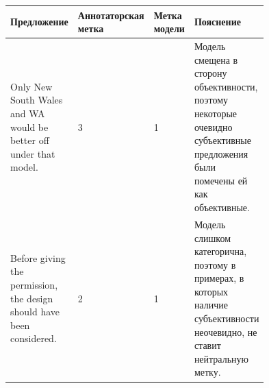 \documentclass[conference]{IEEEtran}
\begin{document}
\begin{table}[h!]
    \begin{center}
        \begin{tabular}{|l|l|l|l|}
            \hline
            Предложение & \thead{Аннотаторская \\ метка} & \thead{Метка \\ модели} & Пояснение \\ \hline
            \makecell[l]{Only New \\ South Wales \\ and WA \\ would be \\ better off \\ under that \\ model.} & 3 & 1 & \makecell[l]{Модель \\ смещена в \\ сторону \\ объективности, \\ поэтому \\ некоторые \\ очевидно \\ субъективные \\ предложения \\ были \\ помечены ей  \\как \\ объективные.} \\ \hline
            \makecell[l]{Before giving \\ the \\ permission, \\ the design \\ should have \\ been \\ considered.} & 2 & 1 & \makecell[l]{Модель \\ слишком \\ категорична, \\ поэтому в \\ примерах, в \\ которых \\ наличие \\ субъективности \\ неочевидно, не \\ ставит \\ нейтральную \\ метку.} \\ \hline

\end{tabular}
\end{center}
\end{table}
\end{document}
